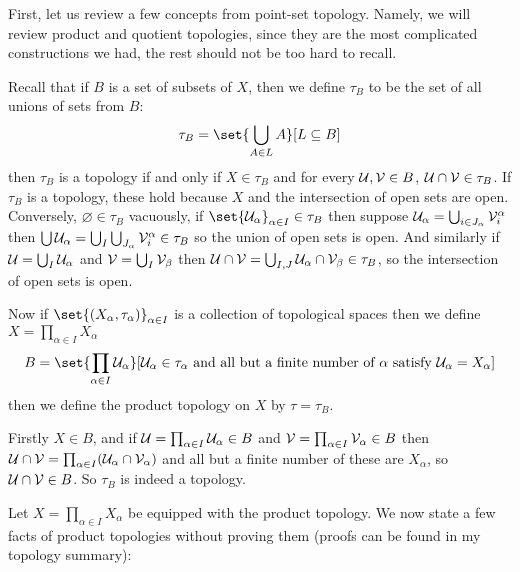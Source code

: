 First, let us review a few concepts from point-set topology.
Namely, we will review product and quotient topologies, since they are the most complicated constructions we had, the rest should not be too hard to recall.

Recall that if $B$ is a set of subsets of $X$, then we define $\tau_B$ to be the set of all unions of sets from $B$:
$$ \tau_B = \set{\bigcup_{A\in L}A}[L\subseteq B] $$
then $\tau_B$ is a topology if and only if $X\in\tau_B$ and for every ${\cal U},{\cal V}\in B$, ${\cal U}\cap{\cal V}\in\tau_B$.
If $\tau_B$ is a topology, these hold because $X$ and the intersection of open sets are open.
Conversely, $\varnothing\in\tau_B$ vacuously, if $\set{\U_\alpha}_{\alpha\in I}\in\tau_B$ then suppose ${\cal U}_\alpha=\bigcup_{i\in J_\alpha}{\cal V}_i^\alpha$ then
$\bigcup{\cal U}_\alpha=\bigcup_I\bigcup_{J_\alpha}{\cal V}_i^\alpha\in\tau_B$ so the union of open sets is open.
And similarly if ${\cal U}=\bigcup_I{\cal U}_\alpha$ and ${\cal V}=\bigcup_I{\cal V}_\beta$ then ${\cal U}\cap{\cal V}=\bigcup_{I,J}{\cal U}_\alpha\cap{\cal V}_\beta\in\tau_B$, so the intersection of open sets is open.

\bdefn

    Now if $\set{(X_\alpha,\tau_\alpha)}_{\alpha\in I}$ is a collection of topological spaces then we define $X=\prod_{\alpha\in I}X_\alpha$
    $$ B = \set{\prod_{\alpha\in I}\U_\alpha}[\hbox{$\U_\alpha\in\tau_\alpha$ and all but a finite number of $\alpha$ satisfy $\U_\alpha=X_\alpha$}] $$
    then we define the {\emphcolor product topology} on $X$ by $\tau=\tau_B$.

\edefn

Firstly $X\in B$, and if ${\cal U}=\prod_{\alpha\in I}{\cal U}_\alpha\in B$ and ${\cal V}=\prod_{\alpha\in I}{\cal V}_\alpha\in B$ then ${\cal U}\cap{\cal V}=\prod_{\alpha\in I}({\cal U}_\alpha\cap{\cal V}_\alpha)$ and all but a finite number of these
are $X_\alpha$, so ${\cal U}\cap{\cal V}\in B$.
So $\tau_B$ is indeed a topology.

Let $X=\prod_{\alpha\in I}X_\alpha$ be equipped with the product topology.
We now state a few facts of product topologies without proving them (proofs can be found in my topology summary):

